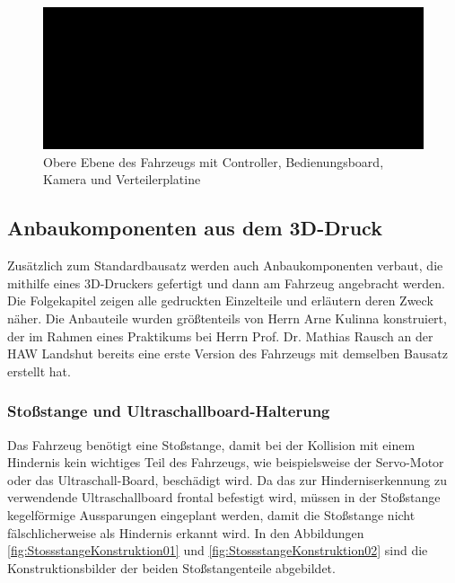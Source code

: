 \begin{figure}[H] %
\includegraphics[width=.72\textwidth]{sec2/images/Grundaufbau/ObereEbene02} 
\centering
\captionsetup{width=.95\textwidth}
\caption[Obere Ebene des Fahrzeugs]{Obere Ebene des Fahrzeugs mit Controller, Bedienungsboard, Kamera und Verteilerplatine}\centering
\label{fig:ObereEbene02}
\end{figure}

\newpage

\subsection{Anbaukomponenten aus dem 3D-Druck}\label{Sec2Sub2}

Zusätzlich zum Standardbausatz werden auch Anbaukomponenten verbaut, die mithilfe eines 3D-Druckers gefertigt und dann am Fahrzeug angebracht werden. Die Folgekapitel zeigen alle gedruckten Einzelteile und erläutern deren Zweck näher. Die Anbauteile wurden größtenteils von Herrn Arne Kulinna konstruiert, der im Rahmen eines Praktikums bei Herrn Prof. Dr. Mathias Rausch an der HAW Landshut bereits eine erste Version des Fahrzeugs mit demselben Bausatz erstellt hat.

\subsubsection{Stoßstange und Ultraschallboard-Halterung}\label{Sec2Sub2SubSub1}

Das Fahrzeug benötigt eine Stoßstange, damit bei der Kollision mit einem Hindernis kein wichtiges Teil des Fahrzeugs, wie beispielsweise der Servo-Motor oder das Ultraschall-Board, beschädigt wird. Da das zur Hinderniserkennung zu verwendende Ultraschallboard frontal befestigt wird, müssen in der Stoßstange kegelförmige Aussparungen eingeplant werden, damit die Stoßstange nicht fälschlicherweise als Hindernis erkannt wird. In den Abbildungen \ref{fig:StossstangeKonstruktion01} und \ref{fig:StossstangeKonstruktion02} sind die Konstruktionsbilder der beiden Stoßstangenteile abgebildet.

